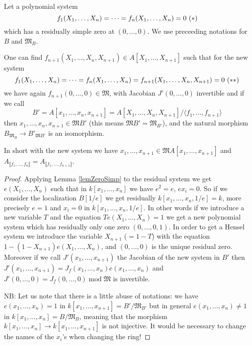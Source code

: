 \documentclass[11pt,a4paper,twoside]{article}
\newcommand \und[1]{\underline{#1}}
\newcommand{\gothic}{\mathfrak}
\newcommand{\fM}{{\gothic M}}
\newcommand\gen[1]{{\langle #1 \rangle}}
\newcommand\lrb[1] {\llbracket #1 \rrbracket}
\newcommand\Afn {A_{\lrb{f_1,\dots,f_n}}}
\newcommand{\mod}{\;\mathrm{mod}\;}
\begin{document}
\begin{proposition} \label{propNewsystem}
Let a polynomial
system
$$
f_1(X_1,\dots,X_n) = \cdots = f_n(X_1,\dots,X_n) = 0 ~\relax{(*)}
$$
which has a residually simple zero at $(0,\dots,0)$. We use preceeding notations for $B$ and $\fM_B$.


\noindent One can find $f_{n+1}(X_1,\dots,X_n, X_{n+1})\in A[X_1,\dots,X_{n+1}]$ such that
for the new system 
$$
f_1(X_1,\dots,X_n) = \cdots = f_n(X_1,\dots,X_n)= f_{n+1}(X_1,\dots,X_n, X_{n+1}) = 0 ~\relax{(**)}
$$
we have again $f_{n+1}(0,\dots,0)\in\fM$, with Jacobian $J'(0,\dots,0)$ invertible 
and if we call 
$$
B'=A[x_1,\dots,x_n, x_{n+1}]=A[X_1,\dots,X_n, X_{n+1}]/\gen{f_1,\dots,f_{n+1}}
$$
then $x_1,\dots,x_n, x_{n+1}\in\fM B'$ (this means $\fM B'=\fM_{B'}$), and the natural morphism $B_{\fM_B}\to B'_{\fM B'}$ is an isomorphism. 

\noindent  In short with the new system we have
 $x_1,\dots, x_{n+1}\in\fM A[x_1,\dots, x_{n+1}]$
and
   $\Afn=A_{\lrb{f_1,\dots,f_{n+1}}} $.  
\end{proposition}
%
\begin{proof}
Applying Lemma \ref{lemZeroSimp} to the residual system we get $e(X_1,\dots,X_n)$ such that in $k[x_1,\dots,x_n]$ we have $e^2=e$, $ex_i=0$.
So if we consider the localization $B[1/e]$ we get residually $k[x_1,\dots,x_n,1/e]=k$, more precisely $e=1$ and $x_i=0$ in $k[x_1,\dots,x_n,1/e]$. 
In other words if we
introduce a new variable $T$ and the equation $Te(X_1,\dots,X_n)=1$
we get a new polynomial system which has residually only one zero $(0,\dots,0,1)$.
In order to get a Hensel system we introduce the variable $X_{n+1}$ ($=1-T$) with
the equation $1-(1-X_{n+1})e(X_1,\dots,X_n)$, and $(0,\dots,0)$ is 
the unique residual zero. Moreover
if we call $J'(x_1,\dots,x_{n+1})$ the Jacobian of the new system in $B'$
then $J'(x_1,\dots,x_{n+1})=J_{\und f}(x_1,\dots,x_{n})e(x_1,\dots,x_{n})$
and $J'(0,\dots,0)=J_{\und f}(0,\dots,0) \mod \fM$ is invertible.

\smallskip 
\noindent NB: Let us note that there is a little abuse of notations:
we have $e(x_1,\dots,x_n)=1$ in $k[x_1,\dots,x_{n+1}]=B'/\fM_{B'}$ but in general
$e(x_1,\dots,x_n)\neq 1$ in $k[x_1,\dots,x_{n}]=B/\fM_B$, meaning that
the morphism $k[x_1,\dots,x_{n}]\to k[x_1,\dots,x_{n+1}]$ is not injective.
It would be necessary to change the names of the $x_i$'s when changing the ring!
\end{proof}
%
\end{document}
